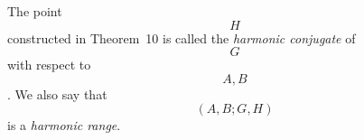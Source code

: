 The point $$H$$ constructed in Theorem~10 is called the \textit{harmonic conjugate} of $$G$$ with respect to $$A, B$$. We also say that $$(A, B; G, H)$$ is a \textit{harmonic range}.
